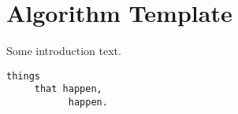 \documentclass[main]{subfiles}
\begin{document}

\section{Algorithm Template}
\renewcommand{\arraystretch}{1.5}


Some introduction text.

\scriptsize
{}
\begin{verbatim}
things
     that happen,
           happen.
\end{verbatim}
\end{document}

